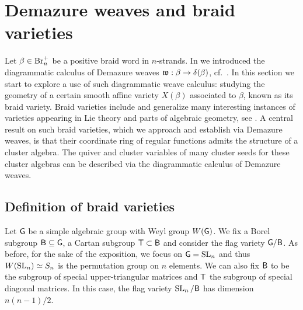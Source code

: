 \section{Demazure weaves and braid varieties}\label{sec:weaves_braid_varieties}

Let $\beta\in\text{Br}_n^+$ be a positive braid word in $n$-strands. In  we introduced the diagrammatic calculus of Demazure weaves $\mathfrak{w}:\beta\to\delta(\beta)$, cf.~. In this section we start to explore a use of such diagrammatic weave calculus: studying the geometry of a certain smooth affine variety $X(\beta)$ associated to $\beta$, known as its braid variety. Braid varieties include and generalize many interesting instances of varieties appearing in Lie theory and parts of algebraic geometry, see . A central result on such braid varieties, which we approach and establish via Demazure weaves, is that their coordinate ring of regular functions admits the structure of a cluster algebra. The quiver and cluster variables of many cluster seeds for these cluster algebras can be described via the diagrammatic calculus of Demazure weaves.

\subsection{Definition of braid varieties}\label{ssec:braidvarieties_def} Let $\mathsf{G}$ be a simple algebraic group with Weyl group $W(\mathsf{G})$. We fix a Borel subgroup  $\mathsf{B}\subseteq\mathsf{G}$, a Cartan subgroup $\mathsf{T}\subset \mathsf{B}$ and consider the flag variety $\mathsf{G}/\mathsf{B}$. As before, for the sake of the exposition, we focus on $\mathsf{G}=\operatorname{SL}_n$ and thus $W(\operatorname{SL}_n)\simeq S_n$ is the permutation group on $n$ elements. We can also fix $\mathsf{B}$ to be the subgroup of special upper-triangular matrices and $\mathsf{T}$ the subgroup of special diagonal matrices. In this case, the flag variety $\operatorname{SL}_n/\mathsf{B}$ has dimension $n(n-1)/2$.\\

